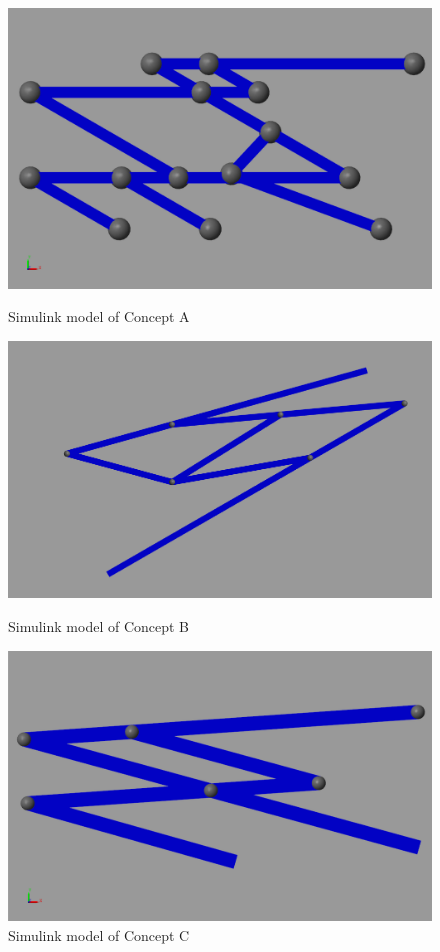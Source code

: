 \documentclass[a4paper]{article}
\begin{document}
\begin{figure}[H]
  \centering
  \begin{minipage}[b]{0.3\textwidth}
    \centering
    \includegraphics[width=1\textwidth]{Fabian.PNG}
    \caption{\label{conceptA} Simulink model of Concept A}
  \end{minipage}
  \hfill
  \begin{minipage}[b]{0.3\textwidth}
    \centering
    \includegraphics[width=1\textwidth]{Terry.PNG}
    \caption{\label{conceptB} Simulink model of Concept B}
  \end{minipage}
  \hfill
   \begin{minipage}[b]{0.3\textwidth}
     \centering
    \includegraphics[width=1\textwidth]{Stuart.PNG}
    \centering
    \caption{\label{conceptC} Simulink model of Concept C}
  \end{minipage}
\end{figure}
\end{document}
